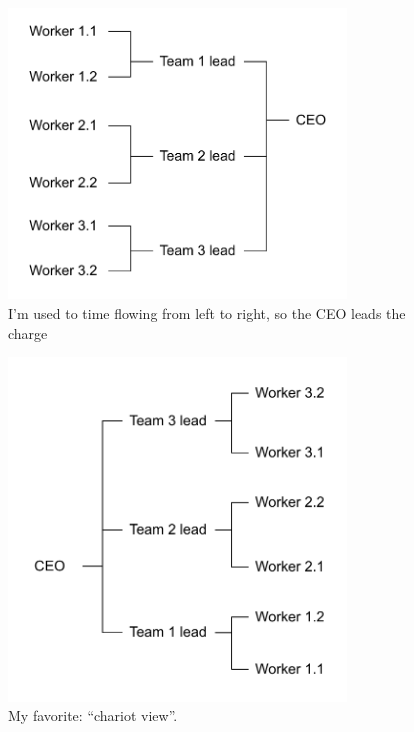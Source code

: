 \begin{figure}
\includegraphics[width=0.8\textwidth]{images/org-chart-orientation-ceo-leads.pdf}
\caption{I'm used to time flowing from left to right, so the CEO leads the charge}
\end{figure}

\begin{figure}
\includegraphics[width=0.8\textwidth]{images/org-chart-orientation-workers-lead.pdf}
\caption{My favorite: ``chariot view''.}
\end{figure}
